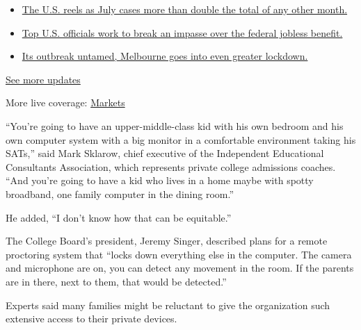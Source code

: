 \begin{itemize}
\tightlist
\item
  \href{https://www.nytimes.com/2020/08/01/world/coronavirus-covid-19.html?action=click\&pgtype=Article\&state=default\&region=MAIN_CONTENT_1\&context=storylines_live_updates\#link-34047410}{The
  U.S. reels as July cases more than double the total of any other
  month.}
\item
  \href{https://www.nytimes.com/2020/08/01/world/coronavirus-covid-19.html?action=click\&pgtype=Article\&state=default\&region=MAIN_CONTENT_1\&context=storylines_live_updates\#link-780ec966}{Top
  U.S. officials work to break an impasse over the federal jobless
  benefit.}
\item
  \href{https://www.nytimes.com/2020/08/01/world/coronavirus-covid-19.html?action=click\&pgtype=Article\&state=default\&region=MAIN_CONTENT_1\&context=storylines_live_updates\#link-2bc8948}{Its
  outbreak untamed, Melbourne goes into even greater lockdown.}
\end{itemize}

\href{https://www.nytimes.com/2020/08/01/world/coronavirus-covid-19.html?action=click\&pgtype=Article\&state=default\&region=MAIN_CONTENT_1\&context=storylines_live_updates}{See
more updates}

More live coverage:
\href{https://www.nytimes.com/live/2020/07/31/business/stock-market-today-coronavirus?action=click\&pgtype=Article\&state=default\&region=MAIN_CONTENT_1\&context=storylines_live_updates}{Markets}

``You're going to have an upper-middle-class kid with his own bedroom
and his own computer system with a big monitor in a comfortable
environment taking his SATs,'' said Mark Sklarow, chief executive of the
Independent Educational Consultants Association, which represents
private college admissions coaches. ``And you're going to have a kid who
lives in a home maybe with spotty broadband, one family computer in the
dining room.''

He added, ``I don't know how that can be equitable.''

The College Board's president, Jeremy Singer, described plans for a
remote proctoring system that ``locks down everything else in the
computer. The camera and microphone are on, you can detect any movement
in the room. If the parents are in there, next to them, that would be
detected.''

Experts said many families might be reluctant to give the organization
such extensive access to their private devices.

